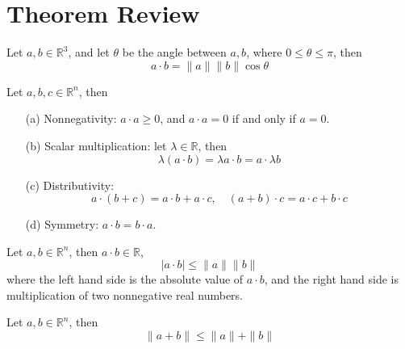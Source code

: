 \documentclass[openany]{book}
\newcommand{\R}{\mathbb{R}}
\begin{document}
\newpage

\chapter{Theorem Review}
\begin{prop}\label{dot}
    Let $a,b\in\R^3$, and let $\theta$ be the angle between $a,b$, where $0\leq\theta\leq\pi$, then 
    \begin{equation*}
        a\cdot b=\|a\|\|b\|\cos\theta
    \end{equation*}
\end{prop}




\begin{prop}
    Let $a,b,c\in\R^n$, then 
    \begin{enumerate}
        \item[(a)] Nonnegativity: $a\cdot a\geq 0$, and $a\cdot a=0$ if and only if $a=0$.
        \item[(b)] Scalar multiplication: let $\lambda\in\R$, then 
        \begin{equation*}
            \lambda(a\cdot b)=\lambda a\cdot b=a\cdot \lambda b
        \end{equation*}
        \item[(c)] Distributivity:
        \begin{equation*}
            a\cdot(b+c)=a\cdot b+a\cdot c, \quad (a+b)\cdot c=a\cdot c+b\cdot c
        \end{equation*}
        \item[(d)] Symmetry: $a\cdot b=b\cdot a$.
    \end{enumerate}
\end{prop}



\begin{prop}
    Let $a,b\in\R^n$, then $a\cdot b\in\R$, 
    \begin{equation*}
        |a\cdot b|\leq\|a\|\|b\|
    \end{equation*}
    where the left hand side is the absolute value of $a\cdot b$, and the right hand side is multiplication of two nonnegative real numbers.
\end{prop}


\begin{prop}\label{traingle}
    Let $a,b\in\R^n$, then 
    \begin{equation*}
        \|a+b\|\leq\|a\|+\|b\|
    \end{equation*}
\end{prop}
\end{document}
